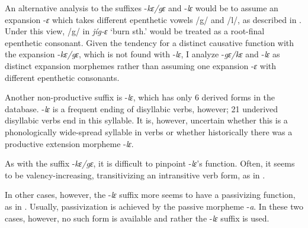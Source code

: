 
An alternative analysis to the suffixes -{\itshape kɛ/gɛ} and -{\itshape lɛ} would be to assume an expansion -{\itshape ɛ} which takes different epenthetic vowels /g/ and /l/, as described in . Under this view, /g/ in {\itshape jíg-ɛ} `burn sth.'  would be treated as a root-final epenthetic consonant. Given the tendency for a distinct causative function with the expansion -{\itshape kɛ/gɛ}, which is not found with -{\itshape lɛ}, I analyze -{\itshape gɛ/kɛ} and -{\itshape lɛ} as distinct expansion morphemes rather than assuming one expansion -{\itshape ɛ} with different epenthetic consonants.




Another non-productive suffix is -{\itshape lɛ}, which has only 6 derived forms in the database. -{\itshape lɛ} is a frequent ending of disyllabic verbs, however; 21 underived disyllabic verbs end in this syllable. It is, however, uncertain whether this is a phonologically wide-spread syllable in verbs or whether historically there was a productive extension morpheme -{\itshape lɛ}.

As with the suffix -{\itshape kɛ/gɛ}, it is difficult to pinpoint -{\itshape lɛ}'s function. Often, it seems to be valency-increasing, transitivizing an intransitive verb form, as in .



In other cases, however, the -{\itshape lɛ} suffix more seems to have a passivizing function, as in . Usually, passivization is achieved by the passive morpheme -{\itshape a}. In these two cases, however, no such form is available and rather the -{\itshape lɛ} suffix is used.


